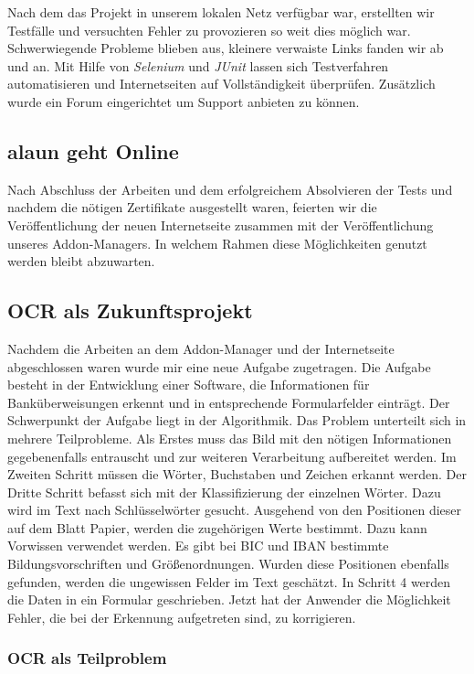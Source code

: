 \documentclass[12pt]{article}
\begin{document}
Nach dem das Projekt in unserem lokalen Netz verfügbar war, erstellten wir Testfälle und versuchten Fehler zu provozieren so weit dies möglich war.
Schwerwiegende Probleme blieben aus, kleinere verwaiste Links fanden wir ab und an. Mit Hilfe von \textit{Selenium} und \textit{JUnit} lassen sich
Testverfahren automatisieren und Internetseiten auf Vollständigkeit überprüfen. Zusätzlich wurde ein Forum eingerichtet um Support anbieten zu können.


\subsection{alaun geht Online}

Nach Abschluss der Arbeiten und dem erfolgreichem Absolvieren der Tests und nachdem die nötigen Zertifikate ausgestellt waren,
feierten wir die Veröffentlichung der neuen Internetseite zusammen mit der Veröffentlichung unseres Addon-Managers.
In welchem Rahmen diese Möglichkeiten genutzt werden bleibt abzuwarten.

\subsection{OCR als Zukunftsprojekt}

Nachdem die Arbeiten an dem Addon-Manager und der Internetseite abgeschlossen waren wurde mir eine neue Aufgabe zugetragen.
Die Aufgabe besteht in der Entwicklung einer Software, die Informationen für Banküberweisungen erkennt und in
entsprechende Formularfelder einträgt.
Der Schwerpunkt der Aufgabe liegt in der Algorithmik. Das Problem unterteilt sich in mehrere Teilprobleme.
Als Erstes muss das Bild mit den nötigen Informationen gegebenenfalls entrauscht und zur weiteren Verarbeitung
aufbereitet werden. Im Zweiten Schritt müssen die Wörter, Buchstaben und Zeichen erkannt werden. Der Dritte
Schritt befasst sich mit der Klassifizierung der einzelnen Wörter.
Dazu wird im Text nach Schlüsselwörter gesucht.
Ausgehend von den Positionen dieser auf dem Blatt Papier, werden die zugehörigen Werte bestimmt.
Dazu kann Vorwissen verwendet werden. Es gibt bei BIC und IBAN bestimmte Bildungsvorschriften und Größenordnungen.
Wurden diese Positionen ebenfalls gefunden, werden die ungewissen Felder im Text geschätzt.
In Schritt 4 werden die Daten in ein Formular geschrieben. Jetzt hat der Anwender die Möglichkeit Fehler, die bei der Erkennung
aufgetreten sind, zu korrigieren.

\subsubsection{OCR als Teilproblem}
\end{document}
